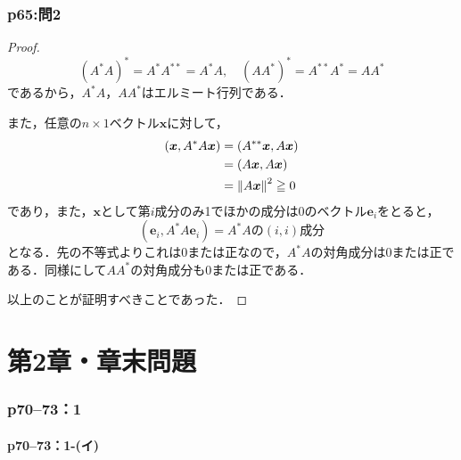 \documentclass[a4paper,10pt,fleqn]{ltjsarticle}
\begin{document}
\section*{p65:問2}

\begin{tleftbar}
  \begin{proof}
    \[
      (A^\ast A)^{\ast} = A^{\ast} A^{\ast \ast} = A^{\ast} A, \quad (A A^{\ast})^\ast = A^{\ast \ast} A^\ast =A A^{\ast}
    \]
    であるから，$A^\ast A$，$A A^{\ast}$はエルミート行列である．

    また，任意の$n \times 1$ベクトル$\bm{x}$に対して，
    \begin{align*}
      (\bm{x}, A^{\ast}A \bm{x}) & = (A^{\ast \ast} \bm{x}, A \bm{x}) \\
                                 & = (A \bm{x}, A \bm{x})             \\
                                 & = \norm{A \bm{x}}^2 \geqq 0
    \end{align*}
    であり，また，$\bm{x}$として第$i$成分のみ1でほかの成分は$0$のベクトル$\bm{e}_i$をとると，
    \[
      (\bm{e}_i, A^{\ast}A \bm{e}_i) = \text{$A^{\ast}A$の$(i,i)$成分}
    \]
    となる．先の不等式よりこれは$0$または正なので，$A^{\ast}A$の対角成分は$0$または正である．同様にして$AA^{\ast}$の対角成分も$0$または正である．

    以上のことが証明すべきことであった．
  \end{proof}
\end{tleftbar}

\newpage
\part*{第2章・章末問題}

\section*{p70--73：1}

\subsection*{p70--73：1-(イ)}
\end{document}
